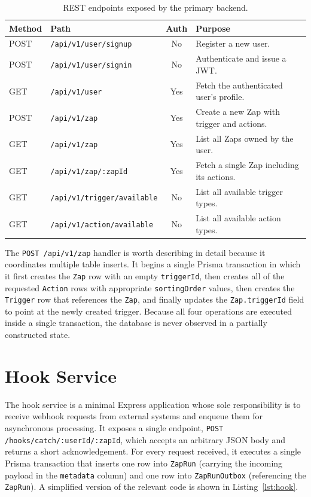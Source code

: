 \begin{table}[h]
\centering
\caption{REST endpoints exposed by the primary backend.}
\label{tab:endpoints}
\renewcommand{\arraystretch}{1.3}
\begin{tabular}{|l|p{4.2cm}|c|p{5.0cm}|}
\hline
\textbf{Method} & \textbf{Path} & \textbf{Auth} & \textbf{Purpose} \\ \hline
POST & \texttt{/api/v1/user/signup} & No & Register a new user. \\ \hline
POST & \texttt{/api/v1/user/signin} & No & Authenticate and issue a JWT. \\ \hline
GET & \texttt{/api/v1/user} & Yes & Fetch the authenticated user's profile. \\ \hline
POST & \texttt{/api/v1/zap} & Yes & Create a new Zap with trigger and actions. \\ \hline
GET & \texttt{/api/v1/zap} & Yes & List all Zaps owned by the user. \\ \hline
GET & \texttt{/api/v1/zap/:zapId} & Yes & Fetch a single Zap including its actions. \\ \hline
GET & \texttt{/api/v1/trigger/available} & No & List all available trigger types. \\ \hline
GET & \texttt{/api/v1/action/available} & No & List all available action types. \\ \hline
\end{tabular}
\end{table}

The \texttt{POST /api/v1/zap} handler is worth describing in detail because it coordinates multiple table inserts. It begins a single Prisma transaction in which it first creates the \texttt{Zap} row with an empty \texttt{triggerId}, then creates all of the requested \texttt{Action} rows with appropriate \texttt{sortingOrder} values, then creates the \texttt{Trigger} row that references the \texttt{Zap}, and finally updates the \texttt{Zap.triggerId} field to point at the newly created trigger. Because all four operations are executed inside a single transaction, the database is never observed in a partially constructed state.

\section{Hook Service}

The hook service is a minimal Express application whose sole responsibility is to receive webhook requests from external systems and enqueue them for asynchronous processing. It exposes a single endpoint, \texttt{POST /hooks/catch/:userId/:zapId}, which accepts an arbitrary JSON body and returns a short acknowledgement. For every request received, it executes a single Prisma transaction that inserts one row into \texttt{ZapRun} (carrying the incoming payload in the \texttt{metadata} column) and one row into \texttt{ZapRunOutbox} (referencing the \texttt{ZapRun}). A simplified version of the relevant code is shown in Listing~\ref{lst:hook}.

